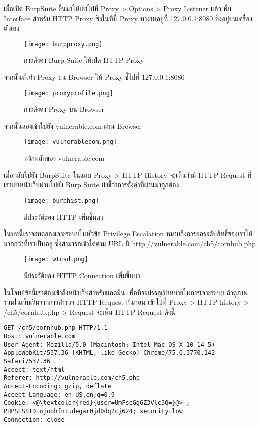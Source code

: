 เมื่อเปิด BurpSuite ขึ้นมาให้เข้าไปที่ Proxy > Options > Proxy Listener แล้วเพิ่ม Interface สำหรับ HTTP Proxy ซึ่งในที่นี้ Proxy ทำงานอยู่ที่ 127.0.0.1:8080 ซึ่งอยู่บนเครื่องตัวเอง

\begin{figure}[h]
	\centering
	\texttt{[image: burpproxy.png]}
	\caption{การตั้งค่า Burp Suite ให้เปิด HTTP Proxy}
	\label{Fig:burpproxy.png}
\end{figure}

จากนั้นตั้งค่า Proxy บน Browser ให้ Proxy ชี้ไปที่ 127.0.0.1:8080

\begin{figure}[h]
	\centering
	\texttt{[image: proxyprofile.png]}
	\caption{การตั้งค่า Proxy บน Browser}
	\label{Fig:proxyprofile.png}
\end{figure}

จากนั้นลองเข้าไปยัง vulnerable.com ผ่าน Browser

\begin{figure}[h]
	\centering
	\texttt{[image: vulnerablecom.png]}
	\caption{หน้าหลักของ vulnerable.com}
	\label{Fig:vulnerablecom.png}
\end{figure}

เมื่อกลับไปยัง BurpSuite ในแถบ Proxy > HTTP History  จะเห็นว่ามี HTTP Request ที่เราเข้าหน้าเว็บผ่านไปยัง Burp Suite บ่งชี้ว่าการตั้งค่าที่ผ่านมาถูกต้อง

\begin{figure}[h]
	\centering
	\texttt{[image: burphist.png]}
	\caption{มีประวัติของ HTTP เพิ่มขึ้นมา}
	\label{Fig:burphist.png}
\end{figure}

ในบทนี้เราจะทดลองเจาะระบบในหัวข้อ Privilege Escalation หมายถึงการยกระดับสิทธิ์ของเราให้มากกว่าที่เราเป็นอยู่ ซึ่งสามารถเข้าได้ตาม URL นี้ http://vulnerable.com/ch5/cornhub.php 

\begin{figure}[h]
	\centering
	\texttt{[image: wtcsd.png]}
	\caption{มีประวัติของ HTTP Connection เพิ่มขึ้นมา}
	\label{Fig:wtcsd.png}
\end{figure}

ในโจทย์ข้อนี้เราต้องเข้าถึงหน้าเว็บสำหรับแอดมิน เพื่อที่จะปรรลุเป้าหมายในการเจาะระบบ ถ้าดูภาพรวมในเว็บเริ่มจากการสำรวจ HTTP Request กันก่อน เข้าไปที่ Proxy > HTTP history > /ch5/cornhub.php > Request จะเห็น HTTP Request ดังนี้

\begin{lstlisting}[numbers=none] 
GET /ch5/cornhub.php HTTP/1.1
Host: vulnerable.com
User-Agent: Mozilla/5.0 (Macintosh; Intel Mac OS X 10_14_5) AppleWebKit/537.36 (KHTML, like Gecko) Chrome/75.0.3770.142 Safari/537.36
Accept: text/html
Referer: http://vulnerable.com/ch5.php
Accept-Encoding: gzip, deflate
Accept-Language: en-US,en;q=0.9
Cookie: <@\textcolor{red}{user=UmFscGg6Z3Vlc3Q=}@> ; PHPSESSID=ujoohfntudegar0jd0dq2cj624; security=low
Connection: close
\end{lstlisting}

